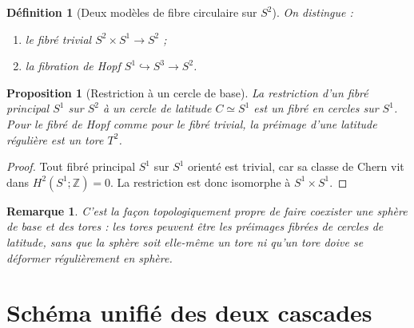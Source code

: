 \documentclass[11pt,a4paper]{article}
\newtheorem{proposition}[theorem]{Proposition}
\newtheorem{definition}[theorem]{Définition}
\newtheorem{remark}[theorem]{Remarque}
\newcommand{\Z}{\mathbb Z}
\begin{document}
\begin{definition}[Deux modèles de fibre circulaire sur $S^2$]
On distingue :
\begin{enumerate}[label=\textup{(\roman*)}]
\item le fibré trivial $S^2\times S^1\to S^2$ ;
\item la fibration de Hopf $S^1\hookrightarrow S^3\to S^2$.
\end{enumerate}
\end{definition}

\begin{proposition}[Restriction à un cercle de base]
La restriction d'un fibré principal $S^1$ sur $S^2$ à un cercle de latitude $C\simeq S^1$ est un fibré en cercles sur $S^1$. Pour le fibré de Hopf comme pour le fibré trivial, la préimage d'une latitude régulière est un tore $T^2$.
\end{proposition}

\begin{proof}
Tout fibré principal $S^1$ sur $S^1$ orienté est trivial, car sa classe de Chern vit dans $H^2(S^1;\Z)=0$. La restriction est donc isomorphe à $S^1\times S^1$.
\end{proof}

\begin{remark}
C'est la façon topologiquement propre de faire coexister une sphère de base et des tores : les tores peuvent être les préimages fibrées de cercles de latitude, sans que la sphère soit elle-même un tore ni qu'un tore doive se déformer régulièrement en sphère.
\end{remark}

\section{Schéma unifié des deux cascades}
\end{document}
